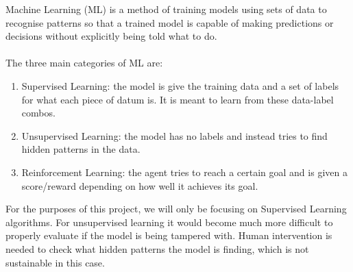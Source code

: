 Machine Learning (ML) is a method of training models using sets of data to recognise patterns so that a trained model is capable of making predictions or decisions without explicitly being told what to do.\\ \\
The three main categories of ML are:
\begin{enumerate}
    \item Supervised Learning: the model is give the training data and a set of labels for what each piece of datum is. It is meant to learn from these data-label combos.
    
    \item Unsupervised Learning: the model has no labels and instead tries to find hidden patterns in the data.
    
    \item Reinforcement Learning: the agent tries to reach a certain goal and is given a score/reward depending on how well it achieves its goal.
\end{enumerate}
For the purposes of this project, we will only be focusing on Supervised Learning algorithms. For unsupervised learning it would become much more difficult to properly evaluate if the model is being tampered with. Human intervention is needed to check what hidden patterns the model is finding, which is not sustainable in this case.


